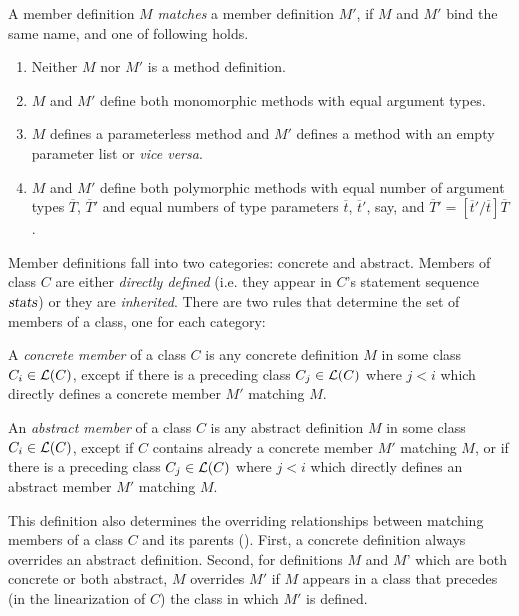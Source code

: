 \begin{definition}
A member definition $M$ {\em matches} a member definition $M'$, if $M$
and $M'$ bind the same name, and one of following holds.
\begin{enumerate}
\item Neither $M$ nor $M'$ is a method definition.
\item $M$ and $M'$ define both monomorphic methods with equal argument
  types.
\item $M$ defines a parameterless method and $M'$ defines a method
  with an empty parameter list \code{()} or {\em vice versa}. 
\item $M$ and $M'$ define both polymorphic methods with 
equal number of argument types $\overline T$, $\overline T'$
and equal numbers of type parameters
$\overline t$, $\overline t'$, say, and $\overline T' = [\overline t'/\overline t]\overline T$.
\end{enumerate}
\end{definition}
Member definitions fall into two categories: concrete and abstract.
Members of class $C$ are either {\em directly defined} (i.e. they appear in
$C$'s statement sequence $\mbox{\sl stats}$) or they are {\em inherited}.  There are two rules
that determine the set of members of a class, one for each category:

\begin{definition}\label{def:member}
A {\em concrete member} of a class $C$ is any concrete definition $M$ in
some class $C_i \in {\cal L}(C)$, except if there is a preceding class $C_j
\in {\cal L}(C)$ where $j < i$ which directly defines a concrete member $M'$ matching $M$.  

An {\em abstract member} of a class $C$ is any abstract definition $M$
in some class $C_i \in {\cal L}(C)$, except if $C$ contains already a
concrete member $M'$ matching $M$, or if there is a preceding class
$C_j \in {\cal L}(C)$ where $j < i$ which directly defines an abstract member $M'$ matching
$M$.
\end{definition}
This definition also determines the overriding relationships between
matching members of a class $C$ and its parents ().  
First, a concrete definition always overrides an abstract definition.  Second, for
definitions $M$ and $M$' which are both concrete or both abstract, $M$
overrides $M'$ if $M$ appears in a class that precedes (in the
linearization of $C$) the class in which $M'$ is defined.

